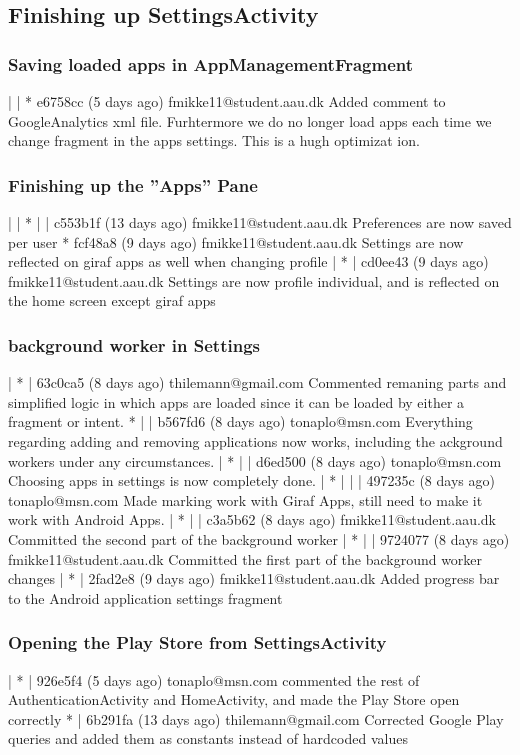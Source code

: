 \subsection{Finishing up SettingsActivity}

\subsubsection{Saving loaded apps in AppManagementFragment}
| | * e6758cc (5 days ago) fmikke11@student.aau.dk Added comment to GoogleAnalytics xml file. Furhtermore we do no longer load apps each time we change fragment in the apps settings. This is a hugh optimizat
ion.

\subsubsection{Finishing up the ''Apps'' Pane}
| | * | | c553b1f (13 days ago) fmikke11@student.aau.dk Preferences are now saved per user
* fcf48a8 (9 days ago) fmikke11@student.aau.dk Settings are now reflected on giraf apps as well when changing profile
| * | cd0ee43 (9 days ago) fmikke11@student.aau.dk Settings are now profile individual, and is reflected on the home screen except giraf apps

\subsubsection{background worker in Settings}
| * | 63c0ca5 (8 days ago) thilemann@gmail.com Commented remaning parts and simplified logic in which apps are loaded since it can be loaded by either a fragment or intent.
* | | b567fd6 (8 days ago) tonaplo@msn.com Everything regarding adding and removing applications now works, including the ackground workers under any circumstances.
| * | | d6ed500 (8 days ago) tonaplo@msn.com Choosing apps in settings is now completely done.
| * | | | 497235c (8 days ago) tonaplo@msn.com Made marking work with Giraf Apps, still need to make it work with Android Apps.
| * | | c3a5b62 (8 days ago) fmikke11@student.aau.dk Committed the second part of the background worker
| * | | 9724077 (8 days ago) fmikke11@student.aau.dk Committed the first part of the background worker changes
| * | 2fad2e8 (9 days ago) fmikke11@student.aau.dk Added progress bar to the Android application settings fragment

\subsubsection{Opening the Play Store from SettingsActivity}
| * | 926e5f4 (5 days ago) tonaplo@msn.com commented the rest of AuthenticationActivity and HomeActivity, and made the Play Store open correctly
* | 6b291fa (13 days ago) thilemann@gmail.com Corrected Google Play queries and added them as constants instead of hardcoded values

